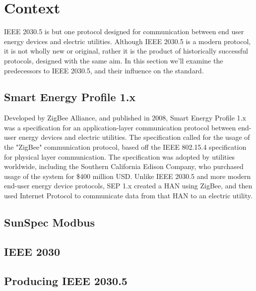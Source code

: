 \chapter{Context}\label{ch:context}

IEEE 2030.5 is but one protocol designed for communication between end user energy devices and electric utilities. 
Although IEEE 2030.5 is a modern protocol, it is not wholly new or original, rather it is the product of historically successful protocols, designed with the same aim.
In this section we'll examine the predecessors to IEEE 2030.5, and their influence on the standard.

\section{Smart Energy Profile 1.x}
Developed by ZigBee Alliance, and published in 2008, Smart Energy Profile 1.x was a specification for an application-layer communication protocol between end-user energy devices and electric utilities. 
The specification called for the usage of the "ZigBee" communication protocol, based off the IEEE 802.15.4 specification for physical layer communication.\cite[]{ZigBeeSEP} \hfill \break
The specification was adopted by utilities worldwide, including the Southern California Edison Company, who purchased usage of the system for \$400 million USD.\cite[]{SEP1Article} \hfill \break
Unlike IEEE 2030.5 and more modern end-user energy device protocols, SEP 1.x created a HAN using ZigBee, and then used Internet Protocol to communicate data from that HAN to an electric utility.

\section{SunSpec Modbus}


\section{IEEE 2030}


\section{Producing IEEE 2030.5}



